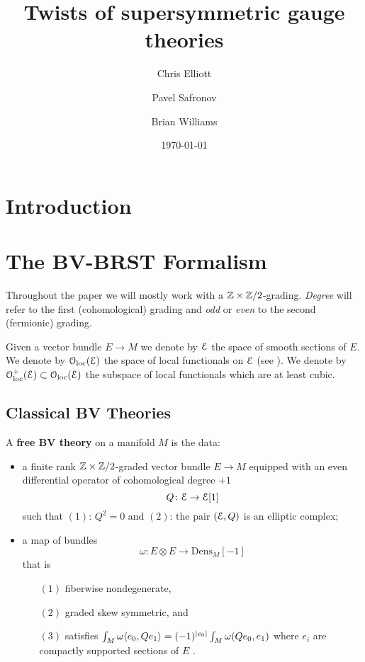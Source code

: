 \documentclass[10pt, oneside]{article}
\title{Twists of supersymmetric gauge theories}
\author{Chris Elliott\and Pavel Safronov \and Brian Williams}
\date{\today}
\newcommand{\Dens}{\mathrm{Dens}}
\begin{document}
\maketitle

\section*{Introduction}

\section{The BV-BRST Formalism}

Throughout the paper we will mostly work with a $\mathbb Z\times\mathbb Z/2$-grading. \emph{Degree} will refer to the first (cohomological) grading and \emph{odd} or \emph{even} to the second (fermionic) grading.

Given a vector bundle $E\rightarrow M$ we denote by $\mathcal E$ the space of smooth sections of $E$. We denote by $\mathcal{O}_{\rm loc}(\mathcal E)$ the space of local functionals on $\mathcal E$ (see \cite[Definition 4.5.1.1]{Book2}). We denote by $\mathcal{O}_{\rm loc}^+(\mathcal E)\subset \mathcal{O}_{\rm loc}(\mathcal E)$ the subspace of local functionals which are at least cubic.

\subsection{Classical BV Theories}

\begin{definition}
A {\bf free BV theory} on a manifold $M$ is the data:
\begin{itemize}
\item a finite rank $\mathbb Z\times\mathbb Z/2$-graded vector bundle $E \to M$ equipped with an even differential operator of cohomological degree $+1$
\[
Q \colon \mathcal E \to \mathcal E [1] 
\]
such that $(1)$: $Q^2 = 0$ and $(2)$: the pair $(\mathcal E , Q)$ is an elliptic complex;
\item a map of bundles
\[
\omega\colon E \otimes E \to \Dens_M [-1]
\]
that is
\begin{enumerate}
\item[$(1)$] fiberwise nondegenerate,
\item[$(2)$] graded skew symmetric, and
\item[$(3)$] satisfies $\int_M \omega\langle e_0, Q e_1\rangle = (-1)^{|e_0|} \int_M \omega(Q e_0, e_1)$ where $e_i$ are compactly supported sections of $E$ .
\end{enumerate}
\end{itemize}
\end{definition}
\end{document}
